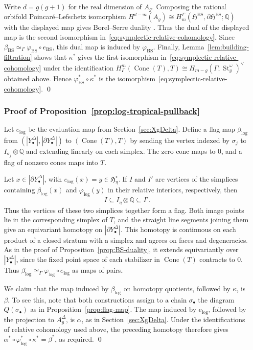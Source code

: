 \documentclass[12 pt]{amsart}
\newcommand{\fH}{\mathfrak H}
\newcommand{\QQ}{\mathbb{Q}}
\newcommand{\BS}{\mathrm{BS}}
\newcommand{\St}{\operatorname{St}}
\newcommand{\Cone}{\operatorname{Cone}}
\newcommand{\<}{\langle}
\renewcommand{\>}{\rangle}
\theoremstyle{definition}
\begin{document}
Write $d = g(g + 1)$ for the real dimension of $A_g$. Composing the rational orbifold Poincar\'e--Lefschetz isomorphism $H^{d - m}(A_g) \cong H_m^\Gamma(\fH^{\BS}, \partial \fH^{\BS}; \QQ)$ with the displayed map gives Borel--Serre duality \cite[\S8.6 and Theorem~11.4.2]{BorelSerre}. Thus the dual of the displayed map is the second isomorphism in~\eqref{eq:symplectic-relative-cohomology}. Since $\beta_{\BS} \simeq_\Gamma \varphi_{\BS} \circ e_{\BS}$, this dual map is induced by $\varphi_{\BS}$. Finally, Lemma~\ref{lem:building-filtration} shows that $\kappa^*$ gives the first isomorphism in~\eqref{eq:symplectic-relative-cohomology} under the identification $H_\Gamma^m(\Cone(T), T) \cong H_{m - g}(\Gamma; \St_g^\omega)^\vee$ obtained above. Hence $\varphi_{\BS}^* \circ \kappa^*$ is the isomorphism~\eqref{eq:symplectic-relative-cohomology}. \qed

\subsubsection{Proof of Proposition~\ref{prop:log-tropical-pullback}}\label{sec:incidence} Let $e_{\log}$ be the evaluation map from Section~\ref{sec:XgDelta}. Define a flag map $\beta_{\log}$ from $(|Y_\bullet^\Delta|, |\partial Y_\bullet^\Delta|)$ to $(\Cone(T), T)$ by sending the vertex indexed by $\sigma_j$ to $I_{\sigma_j} \otimes \QQ$ and extending linearly on each simplex. The zero cone maps to $0$, and a flag of nonzero cones maps into $T$.

Let $x \in |\partial Y_\bullet^\Delta|$, with $e_{\log}(x) = y \in \fH_\eta^\circ$. If $I$ and $I'$ are vertices of the simplices containing $\beta_{\log}(x)$ and $\varphi_{\log}(y)$ in their relative interiors, respectively, then
\[
I \subseteq I_\eta \otimes \QQ \subseteq I'.
\]
Thus the vertices of these two simplices together form a flag. Both image points lie in the corresponding simplex of $T$, and the straight line segments joining them give an equivariant homotopy on $|\partial Y_\bullet^\Delta|$. This homotopy is continuous on each product of a closed stratum with a simplex and agrees on faces and degeneracies. As in the proof of Proposition~\ref{prop:BS-duality}, it extends equivariantly over $|Y_\bullet^\Delta|$, since the fixed point space of each stabilizer in $\Cone(T)$ contracts to $0$. Thus $\beta_{\log} \simeq_\Gamma \varphi_{\log} \circ e_{\log}$ as maps of pairs.

We claim that the map induced by $\beta_{\log}$ on homotopy quotients, followed by $\kappa$, is $\beta$. To see this, note that both constructions assign to a chain $\sigma_\bullet$ the diagram $Q(\sigma_\bullet)$ as in Proposition~\ref{prop:flag-map}. The map induced by $e_{\log}$, followed by the projection to $A_g^\Delta$, is $\alpha$, as in Section~\ref{sec:XgDelta}. Under the identifications of relative cohomology used above, the preceding homotopy therefore gives $\alpha^* \circ \varphi_{\log}^* \circ \kappa^* = \beta^*$, as required. \qed
\end{document}
